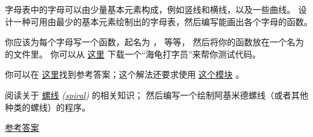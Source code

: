 \begin{exercise}
    


字母表中的字母可以由少量基本元素构成，例如竖线和横线，以及一些曲线。
设计一种可用由最少的基本元素绘制出的字母表，然后编写能画出各个字母的函数。


你应该为每个字母写一个函数，起名为 {\em {} } ，{\em {} }  等等，
然后将你的函数放在一个名为 {\em {} }  的文件里。
你可以从 \href{http://thinkpython2.com/code/typewriter.py}{这里}
下载一个``海龟打字员''来帮你测试代码。


你可以在 \href{http://thinkpython2.com/code/letters.py}{这里}找到参考答案；这个解法还要求使用 \href{http://thinkpython2.com/code/polygon.py}{这个模块} 。

\end{exercise}


\begin{exercise}


阅读关于 \href{https://zh.wikipedia.org/wiki/%E8%9E%BA%E7%BA%BF}{螺线} {\em (\href{http://en.wikipedia.org/wiki/Spiral}{spiral})} 的相关知识；
然后编写一个绘制阿基米德螺线（或者其他种类的螺线）的程序。
  

\href{http://thinkpython2.com/code/spiral.py}{参考答案}

\end{exercise}

